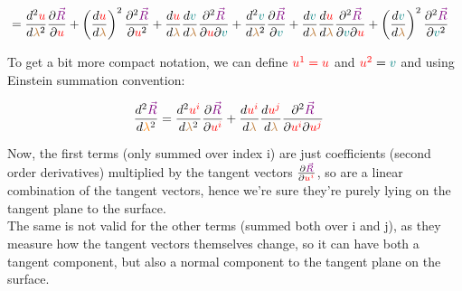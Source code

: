 \begin{align*}
    &= \frac{d^2 \begingroup\color{red}u\endgroup}{d\begingroup\color{brown}\lambda\endgroup^2}\frac{\partial \begingroup\color{violet}\vec{R}\endgroup}{\partial \begingroup\color{red}u\endgroup} 
    + \left(\frac{d \begingroup\color{red}u\endgroup}{d\begingroup\color{brown}\lambda\endgroup}\right)^2 \frac{\partial^2 \begingroup\color{violet}\vec{R}\endgroup}{\partial \begingroup\color{red}u\endgroup^2}
    + \frac{d \begingroup\color{red}u\endgroup}{d\begingroup\color{brown}\lambda\endgroup}\frac{d\begingroup\color{teal}v\endgroup}{d\begingroup\color{brown}\lambda\endgroup} \frac{\partial^2 \begingroup\color{violet}\vec{R}\endgroup}{\partial \begingroup\color{red}u\endgroup \partial\begingroup\color{teal}v\endgroup}
    + \frac{d^2 \begingroup\color{teal}v\endgroup}{d\begingroup\color{brown}\lambda\endgroup^2}\frac{\partial \begingroup\color{violet}\vec{R}\endgroup}{\partial \begingroup\color{teal}v\endgroup} 
    + \frac{d \begingroup\color{teal}v\endgroup}{d\begingroup\color{brown}\lambda\endgroup} \frac{d\begingroup\color{red}u\endgroup}{d\begingroup\color{brown}\lambda\endgroup} \frac{\partial^2 \begingroup\color{violet}\vec{R}\endgroup}{\partial \begingroup\color{teal}v\endgroup \partial\begingroup\color{red}u\endgroup}
    + \left(\frac{d \begingroup\color{teal}v\endgroup}{d\begingroup\color{brown}\lambda\endgroup}\right)^2 \frac{\partial^2 \begingroup\color{violet}\vec{R}\endgroup}{\partial\begingroup\color{teal}v\endgroup^2}
\end{align*}

To get a bit more compact notation, we can define $\color{red}u^1 = u$ and $\begingroup\color{red}u^2\endgroup = \begingroup\color{teal}v\endgroup$ and using Einstein summation convention:

\begin{align*}
    \frac{d^2\begingroup\color{violet}\vec{R}\endgroup}{d\begingroup\color{orange}\lambda\endgroup^2} &=
    \frac{d^2 \begingroup\color{red}u^i\endgroup}{d\begingroup\color{brown}\lambda\endgroup^2}\frac{\partial \begingroup\color{violet}\vec{R}\endgroup}{\partial \begingroup\color{red}u^i\endgroup} 
    + \frac{d \begingroup\color{red}u^i\endgroup}{d\begingroup\color{brown}\lambda\endgroup}\frac{d\begingroup\color{red}u^j\endgroup}{d\begingroup\color{brown}\lambda\endgroup} \frac{\partial^2 \begingroup\color{violet}\vec{R}\endgroup}{\partial \begingroup\color{red}u^i\endgroup \partial\begingroup\color{red}u^j\endgroup}
\end{align*}

Now, the first terms (only summed over index i) are just coefficients (second order derivatives) multiplied by the tangent vectors $\frac{\partial \begingroup\color{violet}\vec{R}\endgroup}{\partial \begingroup\color{red}u^i\endgroup}$, so are
a linear combination of the tangent vectors, hence we're sure they're purely lying on the tangent plane to the surface.\\
The same is not valid for the other terms (summed both over i and j), as they measure how the tangent vectors themselves change, so it can have both a tangent component, but also a normal component to the tangent plane on the surface.\\

